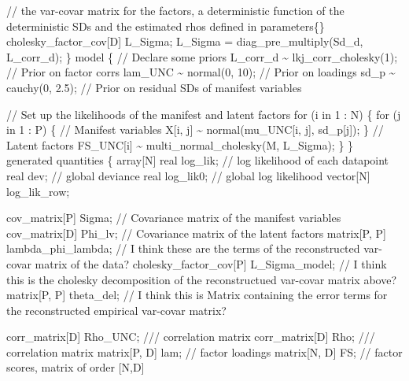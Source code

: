 \documentclass[
  letterpaper,
  DIV=11,
  numbers=noendperiod]{scrreprt}
\newenvironment{Shaded}{\begin{snugshade}}{\end{snugshade}}
\newcommand{\CommentTok}[1]{\textcolor[rgb]{0.37,0.37,0.37}{#1}}
\newcommand{\ControlFlowTok}[1]{\textcolor[rgb]{0.00,0.23,0.31}{#1}}
\newcommand{\DataTypeTok}[1]{\textcolor[rgb]{0.68,0.00,0.00}{#1}}
\newcommand{\DecValTok}[1]{\textcolor[rgb]{0.68,0.00,0.00}{#1}}
\newcommand{\FloatTok}[1]{\textcolor[rgb]{0.68,0.00,0.00}{#1}}
\newcommand{\KeywordTok}[1]{\textcolor[rgb]{0.00,0.23,0.31}{#1}}
\newcommand{\NormalTok}[1]{\textcolor[rgb]{0.00,0.23,0.31}{#1}}
\begin{document}
\begin{Shaded}
\begin{Highlighting}[]
  \CommentTok{// the var{-}covar matrix for the factors, a deterministic function of the deterministic SDs and the estimated rhos defined in parameters\{\}}
  \DataTypeTok{cholesky\_factor\_cov}\NormalTok{[D] L\_Sigma;}
\NormalTok{  L\_Sigma = diag\_pre\_multiply(Sd\_d, L\_corr\_d);}
\NormalTok{\}}
\KeywordTok{model}\NormalTok{ \{}
  \CommentTok{// Declare some priors}
\NormalTok{  L\_corr\_d \textasciitilde{} lkj\_corr\_cholesky(}\DecValTok{1}\NormalTok{); }\CommentTok{// Prior on factor corrs}
\NormalTok{  lam\_UNC \textasciitilde{} normal(}\DecValTok{0}\NormalTok{, }\DecValTok{10}\NormalTok{); }\CommentTok{// Prior on loadings}
\NormalTok{  sd\_p \textasciitilde{} cauchy(}\DecValTok{0}\NormalTok{, }\FloatTok{2.5}\NormalTok{); }\CommentTok{// Prior on residual SDs of manifest variables}
  
  \CommentTok{// Set up the likelihoods of the manifest and latent factors}
  \ControlFlowTok{for}\NormalTok{ (i }\ControlFlowTok{in} \DecValTok{1}\NormalTok{ : N) \{}
    \ControlFlowTok{for}\NormalTok{ (j }\ControlFlowTok{in} \DecValTok{1}\NormalTok{ : P) \{}
      \CommentTok{// Manifest variables}
\NormalTok{      X[i, j] \textasciitilde{} normal(mu\_UNC[i, j], sd\_p[j]);}
\NormalTok{    \}}
    \CommentTok{// Latent factors}
\NormalTok{    FS\_UNC[i] \textasciitilde{} multi\_normal\_cholesky(M, L\_Sigma);}
\NormalTok{  \}}
\NormalTok{\}}
\KeywordTok{generated quantities}\NormalTok{ \{}
  \DataTypeTok{array}\NormalTok{[N] }\DataTypeTok{real}\NormalTok{ log\_lik; }\CommentTok{// log likelihood of each datapoint}
  \DataTypeTok{real}\NormalTok{ dev; }\CommentTok{// global deviance}
  \DataTypeTok{real}\NormalTok{ log\_lik0; }\CommentTok{// global log likelihood}
  \DataTypeTok{vector}\NormalTok{[N] log\_lik\_row;}
  
  \DataTypeTok{cov\_matrix}\NormalTok{[P] Sigma; }\CommentTok{// Covariance matrix of the manifest variables}
  \DataTypeTok{cov\_matrix}\NormalTok{[D] Phi\_lv; }\CommentTok{// Covariance matrix of the latent factors}
  \DataTypeTok{matrix}\NormalTok{[P, P] lambda\_phi\_lambda; }\CommentTok{// I think these are the terms of the reconstructed var{-}covar matrix of the data?}
  \DataTypeTok{cholesky\_factor\_cov}\NormalTok{[P] L\_Sigma\_model; }\CommentTok{// I think this is the cholesky decomposition of the reconstructued var{-}covar matrix above?}
  \DataTypeTok{matrix}\NormalTok{[P, P] theta\_del; }\CommentTok{// I think this is Matrix containing the error terms for the reconstructed empirical var{-}covar matrix?}
  
  \DataTypeTok{corr\_matrix}\NormalTok{[D] Rho\_UNC; }\CommentTok{/// correlation matrix}
  \DataTypeTok{corr\_matrix}\NormalTok{[D] Rho; }\CommentTok{/// correlation matrix}
  \DataTypeTok{matrix}\NormalTok{[P, D] lam; }\CommentTok{// factor loadings}
  \DataTypeTok{matrix}\NormalTok{[N, D] FS; }\CommentTok{// factor scores, matrix of order [N,D]}
  

\end{Highlighting}
\end{Shaded}
\end{document}
